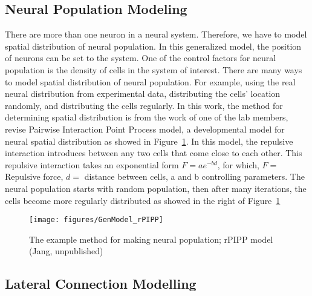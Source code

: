 \subsection{Neural Population Modeling}
There are more than one neuron in a neural system. Therefore, we have to model spatial distribution of neural population. In this generalized model, the position of neurons can be set to the system. One of the control factors for neural population is the density of cells in the system of interest. There are many ways to model spatial distribution of neural population. For example, using the real neural distribution from experimental data, distributing the cells' location randomly, and distributing the cells regularly. In this work, the method for determining spatial distribution is from the work of one of the lab members, revise Pairwise Interaction Point Process model, a developmental model for neural spatial distribution as showed in Figure~\ref{fig:rPIPP}.
In this model, the repulsive interaction introduces between any two cells that come close to each other. This repulsive interaction takes an exponential form $F = a e^{-bd}$, for which, $F =$ Repulsive force, $d = $ distance between cells, a and b controlling parameters. The neural population starts with random population, then after many iterations, the cells become more regularly distributed as showed in the right of Figure~\ref{fig:rPIPP}

\begin{figure}[!t]
	\centering
	\texttt{[image: figures/GenModel\_rPIPP]}
	\caption{The example method for making neural population; rPIPP model (Jang, unpublished)}
	\label{fig:rPIPP}
\end{figure} 

\subsection{Lateral Connection Modelling}

